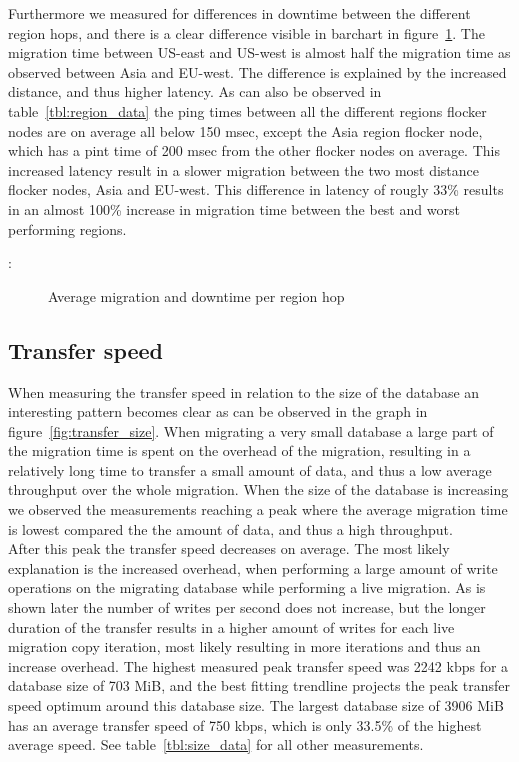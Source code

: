 \documentclass{article}
\begin{document}
Furthermore we measured for differences in downtime between the different region hops, and there is a clear difference visible in barchart in figure~\ref{fig:migration_region}. The migration time between US-east and US-west is almost half the migration time as observed between Asia and EU-west. The difference is explained by the increased distance, and thus higher latency. As can also be observed in table~\ref{tbl:region_data} the ping times between all the different regions flocker nodes are on average all below 150 msec, except the Asia region flocker node, which has a pint time of 200 msec from the other flocker nodes on average. This increased latency result in a slower migration between the two most distance flocker nodes, Asia and EU-west. This difference in latency of rougly 33\% results in an almost 100\% increase in migration time between the best and worst performing regions.

\begin{center}:
\begin{figure}[!ht]
    \caption{Average migration and downtime per region hop}
    \label{fig:migration_region}
\end{figure}
\end{center}


\subsection{Transfer speed}

When measuring the transfer speed in relation to the size of the database an interesting pattern becomes clear as can be observed in the graph in figure~\ref{fig:transfer_size}. When migrating a very small database a large part of the migration time is spent on the overhead of the migration, resulting in a relatively long time to transfer a small amount of data, and thus a low average throughput over the whole migration. When the size of the database is increasing we observed the measurements reaching a peak where the average migration time is lowest compared the the amount of data, and thus a high throughput.\\
After this peak the transfer speed decreases on average. The most likely explanation is the increased overhead, when performing a large amount of write operations on the migrating database while performing a live migration. As is shown later the number of writes per second does not increase, but the longer duration of the transfer results in a higher amount of writes for each live migration copy iteration, most likely resulting in more iterations and thus an increase overhead.
The highest measured peak transfer speed was 2242 kbps for a database size of 703 MiB, and the best fitting trendline projects the peak transfer speed optimum around this database size. The largest database size of 3906 MiB has an average transfer speed of 750 kbps, which is only 33.5\% of the highest average speed. See table~\ref{tbl:size_data} for all other measurements.
\end{document}
